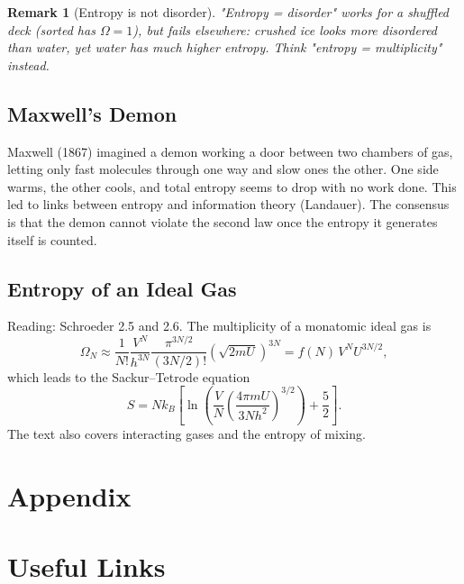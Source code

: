 \documentclass{article}
\newtheorem{remark}{Remark}
\begin{document}
\begin{remark}[Entropy is not disorder]
    "Entropy = disorder" works for a shuffled deck (sorted has $\Omega = 1$), but fails elsewhere: crushed ice looks more disordered than water, yet water has much higher entropy. Think "entropy = multiplicity" instead.
\end{remark}

\subsection{Maxwell's Demon}
Maxwell (1867) imagined a demon working a door between two chambers of gas, letting only fast molecules through one way and slow ones the other. One side warms, the other cools, and total entropy seems to drop with no work done. This led to links between entropy and information theory (Landauer). The consensus is that the demon cannot violate the second law once the entropy it generates itself is counted.

\subsection{Entropy of an Ideal Gas}
Reading: Schroeder 2.5 and 2.6. The multiplicity of a monatomic ideal gas is
\[\Omega_N \approx \frac{1}{N!}\frac{V^N}{h^{3N}}\frac{\pi^{3N/2}}{(3N/2)!}\left(\sqrt{2mU}\right)^{3N} = f(N)\,V^N U^{3N/2},\]
which leads to the Sackur--Tetrode equation
\[S = Nk_B\left[\ln\left(\frac{V}{N}\left(\frac{4\pi m U}{3Nh^2}\right)^{3/2}\right) + \frac{5}{2}\right].\]
The text also covers interacting gases and the entropy of mixing.

\newpage
\appendix
\section{Appendix}

\section{Useful Links}
\end{document}
